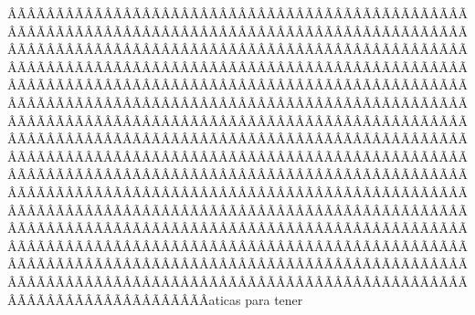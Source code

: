 \begin{sumilla}
\begin{fundamentacion}
ÂÃÂÃÂÃÂÃÂÃÂÃÂÃÂÃÂÃÂÃÂÃÂÃÂÃÂÃÂÃÂÃÂÃÂÃÂÃÂÃÂÃÂÃÂÃÂÃÂÃÂÃÂÃÂÃÂÃÂÃÂÃÂÃÂÃÂÃÂÃÂÃÂÃÂÃÂÃÂÃÂÃÂÃÂÃÂÃÂÃÂÃÂÃÂÃÂÃÂÃÂÃÂÃÂÃÂÃÂÃÂÃÂÃÂÃÂÃÂÃÂÃÂÃÂÃÂÃÂÃÂÃÂÃÂÃÂÃÂÃÂÃÂÃÂÃÂÃÂÃÂÃÂÃÂÃÂÃÂÃÂÃÂÃÂÃÂÃÂÃÂÃÂÃÂÃÂÃÂÃÂÃÂÃÂÃÂÃÂÃÂÃÂÃÂÃÂÃÂÃÂÃÂÃÂÃÂÃÂÃÂÃÂÃÂÃÂÃÂÃÂÃÂÃÂÃÂÃÂÃÂÃÂÃÂÃÂÃÂÃÂÃÂÃÂÃÂÃÂÃÂÃÂÃÂÃÂÃÂÃÂÃÂÃÂÃÂÃÂÃÂÃÂÃÂÃÂÃÂÃÂÃÂÃÂÃÂÃÂÃÂÃÂÃÂÃÂÃÂÃÂÃÂÃÂÃÂÃÂÃÂÃÂÃÂÃÂÃÂÃÂÃÂÃÂÃÂÃÂÃÂÃÂÃÂÃÂÃÂÃÂÃÂÃÂÃÂÃÂÃÂÃÂÃÂÃÂÃÂÃÂÃÂÃÂÃÂÃÂÃÂÃÂÃÂÃÂÃÂÃÂÃÂÃÂÃÂÃÂÃÂÃÂÃÂÃÂÃÂÃÂÃÂÃÂÃÂÃÂÃÂÃÂÃÂÃÂÃÂÃÂÃÂÃÂÃÂÃÂÃÂÃÂÃÂÃÂÃÂÃÂÃÂÃÂÃÂÃÂÃÂÃÂÃÂÃÂÃÂÃÂÃÂÃÂÃÂÃÂÃÂÃÂÃÂÃÂÃÂÃÂÃÂÃÂÃÂÃÂÃÂÃÂÃÂÃÂÃÂÃÂÃÂÃÂÃÂÃÂÃÂÃÂÃÂÃÂÃÂÃÂÃÂÃÂÃÂÃÂÃÂÃÂÃÂÃÂÃÂÃÂÃÂÃÂÃÂÃÂÃÂÃÂÃÂÃÂÃÂÃÂÃÂÃÂÃÂÃÂÃÂÃÂÃÂÃÂÃÂÃÂÃÂÃÂÃÂÃÂÃÂÃÂÃÂÃÂÃÂÃÂÃÂÃÂÃÂÃÂÃÂÃÂÃÂÃÂÃÂÃÂÃÂÃÂÃÂÃÂÃÂÃÂÃÂÃÂÃÂÃÂÃÂÃÂÃÂÃÂÃÂÃÂÃÂÃÂÃÂÃÂÃÂÃÂÃÂÃÂÃÂÃÂÃÂÃÂÃÂÃÂÃÂÃÂÃÂÃÂÃÂÃÂÃÂÃÂÃÂÃÂÃÂÃÂÃÂÃÂÃÂÃÂÃÂÃÂÃÂÃÂÃÂÃÂÃÂÃÂÃÂÃÂÃÂÃÂÃÂÃÂÃÂÃÂÃÂÃÂÃÂÃÂÃÂÃÂÃÂÃÂÃÂÃÂÃÂÃÂÃÂÃÂÃÂÃÂÃÂÃÂÃÂÃÂÃÂÃÂaticas para tener 
\end{fundamentacion}
\end{sumilla}
